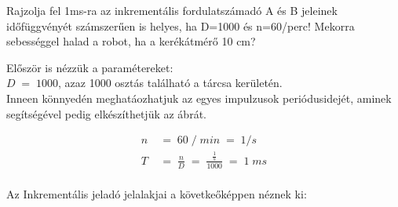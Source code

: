 \begin{example2}

Rajzolja fel 1ms-ra az inkrementális fordulatszámadó A és B jeleinek időfüggvényét számszerűen is helyes, ha D=1000 és n=60/perc! Mekorra sebességgel halad a robot, ha a kerékátmérő 10 cm?

\end{example2}

Először is nézzük a paramétereket: \\

$D\;=\;1000$, azaz 1000 osztás található a tárcsa kerületén. \\

Inneen könnyedén meghatáozhatjuk az egyes impulzusok periódusidejét, aminek segítségével pedig elkészíthetjük az ábrát.

\begin{equation}
\begin{aligned}{}
    n\;&=\;60\; / \; min \; = \; 1/s \\
    T\; &= \; \frac{n}{D}\; = \; \frac{\frac{1}{s}}{1000}\;=\;1\;ms \\
\end{aligned}
\end{equation}

Az Inkrementális jeladó jelalakjai a követkeőképpen néznek ki:

